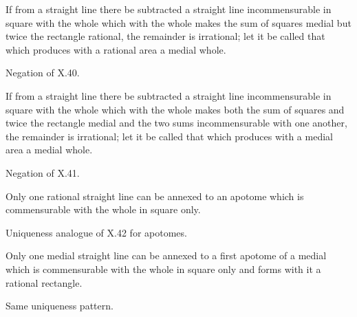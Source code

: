 \documentclass{rrxiv}
\begin{document}
\begin{claim}
\label{prop:X.77}
If from a straight line there be subtracted a straight line
incommensurable in square with the whole which with the whole makes
the sum of squares medial but twice the rectangle rational, the
remainder is irrational; let it be called that which produces with
a rational area a medial whole.
\end{claim}
\begin{evidence}[Proof of X.77]
\label{ev:X.77}
Negation of X.40.
\end{evidence}

\begin{claim}
\label{prop:X.78}
If from a straight line there be subtracted a straight line
incommensurable in square with the whole which with the whole makes
both the sum of squares and twice the rectangle medial and the two
sums incommensurable with one another, the remainder is irrational;
let it be called that which produces with a medial area a medial
whole.
\end{claim}
\begin{evidence}[Proof of X.78]
\label{ev:X.78}
Negation of X.41.
\end{evidence}

\begin{claim}
\label{prop:X.79}
Only one rational straight line can be annexed to an apotome which
is commensurable with the whole in square only.
\end{claim}
\begin{evidence}[Proof of X.79]
\label{ev:X.79}
Uniqueness analogue of X.42 for apotomes.
\end{evidence}

\begin{claim}
\label{prop:X.80}
Only one medial straight line can be annexed to a first apotome of
a medial which is commensurable with the whole in square only and
forms with it a rational rectangle.
\end{claim}
\begin{evidence}[Proof of X.80]
\label{ev:X.80}
Same uniqueness pattern.
\end{evidence}
\end{document}
